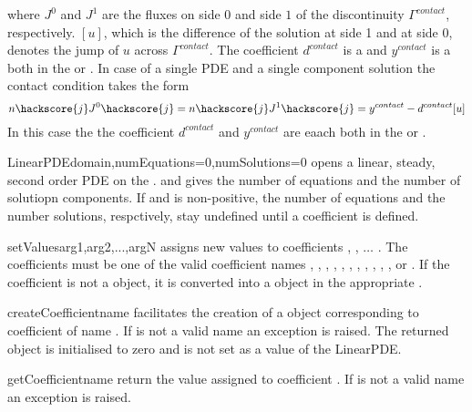 where $J^{0}$ and $J^{1}$ are the fluxes on side $0$ and side $1$ of the
discontinuity $\Gamma^{contact}$, respectively. $[u]$, which is the difference
of the solution at side 1 and at side 0, denotes the jump of $u$ across $\Gamma^{contact}$.
The coefficient $d^{contact}$ is a \RankTwo and $y^{contact}$ is a  
\RankOne both in the \FunctionOnContactZero or \FunctionOnContactOne.
In case of a single PDE and a single component solution the contact condition takes the form
\begin{equation}\label{LINEARPDE.SINGLE.6}
n\hackscore{j} J^{0}\hackscore{j}=n\hackscore{j} J^{1}\hackscore{j}=y^{contact} - d^{contact}[u]
\end{equation}
In this case the the coefficient $d^{contact}$ and $y^{contact}$ are eaach \Scalar
both in the \FunctionOnContactZero or \FunctionOnContactOne.
 
\begin{classdesc}{LinearPDE}{domain,numEquations=0,numSolutions=0}
opens a linear, steady, second order PDE on the \Domain {}. 
and  gives the number of equations and the number of solutiopn components.
If  and  is non-positive, the number of equations 
and the number solutions, respctively, stay undefined until a coefficient is
defined. 
\end{classdesc}

\begin{methoddesc}[LinearPDE]{setValues}{arg1,arg2,...,argN}
assigns new values to coefficients , , $\ldots$ . 
The coefficients must be one of the valid coefficient names
,
,
,
,
,
,
,
,
,
,
,
or .
If the coefficient is not a \Data object, it is converted into a \Data object in the
appropriate \FunctionSpace.
\end{methoddesc}

\begin{methoddesc}[LinearPDE]{createCoefficient}{name}
facilitates the creation of a \Data object corresponding to coefficient of name
. If  is not a valid name an exception is raised. The
returned \Data object is initialised to zero and is not set as a value of the
LinearPDE.
\end{methoddesc}

\begin{methoddesc}[LinearPDE]{getCoefficient}{name}
return the value assigned to coefficient . If  is not a valid name 
an exception is raised. 
\end{methoddesc}

